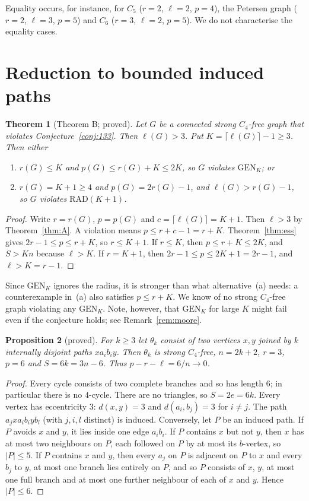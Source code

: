 \documentclass[11pt]{amsart}
\newtheorem{theorem}{Theorem}[section]
\newtheorem{proposition}[theorem]{Proposition}
\theoremstyle{definition}
\theoremstyle{remark}
\newcommand{\lr}{\ell}
\newcommand{\pp}{p}
\newcommand{\GEN}{\mathrm{GEN}}
\newcommand{\RAD}{\mathrm{RAD}}
\begin{document}
Equality occurs, for instance, for $C_5$ ($r=2$, $\lr=2$, $\pp=4$), the Petersen graph ($r=2$, $\lr=3$, $\pp=5$) and $C_6$ ($r=3$, $\lr=2$, $\pp=5$). We do not characterise the equality cases.

\section{Reduction to bounded induced paths}\label{sec:band}

\begin{theorem}[Theorem B; proved]\label{thm:B}
Let $G$ be a connected strong $C_4$-free graph that violates Conjecture~\ref{conj:133}. Then $\lr(G)>3$. Put $K=\lceil\lr(G)\rceil-1\ge3$. Then either
\begin{enumerate}
\item[(a)] $r(G)\le K$ and $\pp(G)\le r(G)+K\le2K$, so $G$ violates $\GEN_K$; or
\item[(b)] $r(G)=K+1\ge4$ and $\pp(G)=2r(G)-1$, and $\lr(G)>r(G)-1$, so $G$ violates $\RAD(K+1)$.
\end{enumerate}
\end{theorem}

\begin{proof}
Write $r=r(G)$, $\pp=\pp(G)$ and $c=\lceil\lr(G)\rceil=K+1$. Then $\lr>3$ by Theorem~\ref{thm:A}. A violation means $\pp\le r+c-1=r+K$. Theorem~\ref{thm:ess} gives $2r-1\le\pp\le r+K$, so $r\le K+1$. If $r\le K$, then $\pp\le r+K\le2K$, and $S>Kn$ because $\lr>K$. If $r=K+1$, then $2r-1\le\pp\le 2K+1=2r-1$, and $\lr>K=r-1$.
\end{proof}

Since $\GEN_K$ ignores the radius, it is stronger than what alternative~(a) needs: a counterexample in~(a) also satisfies $\pp\le r+K$. We know of no strong $C_4$-free graph violating any $\GEN_K$. Note, however, that $\GEN_K$ for large $K$ might fail even if the conjecture holds; see Remark~\ref{rem:moore}.

\begin{proposition}[proved]\label{prop:theta}
For $k\ge3$ let $\theta_k$ consist of two vertices $x,y$ joined by $k$ internally disjoint paths $xa_ib_iy$. Then $\theta_k$ is strong $C_4$-free, $n=2k+2$, $r=3$, $\pp=6$ and $S=6k=3n-6$. Thus $\pp-r-\lr=6/n\to0$.
\end{proposition}

\begin{proof}
Every cycle consists of two complete branches and so has length $6$; in particular there is no $4$-cycle. There are no triangles, so $S=2e=6k$. Every vertex has eccentricity $3$: $d(x,y)=3$ and $d(a_i,b_j)=3$ for $i\ne j$. The path $a_jxa_ib_iyb_l$ (with $j,i,l$ distinct) is induced. Conversely, let $P$ be an induced path. If $P$ avoids $x$ and $y$, it lies inside one edge $a_ib_i$. If $P$ contains $x$ but not $y$, then $x$ has at most two neighbours on $P$, each followed on $P$ by at most its $b$-vertex, so $|P|\le5$. If $P$ contains $x$ and $y$, then every $a_j$ on $P$ is adjacent on $P$ to $x$ and every $b_j$ to $y$, at most one branch lies entirely on $P$, and so $P$ consists of $x$, $y$, at most one full branch and at most one further neighbour of each of $x$ and $y$. Hence $|P|\le6$.
\end{proof}
\end{document}
